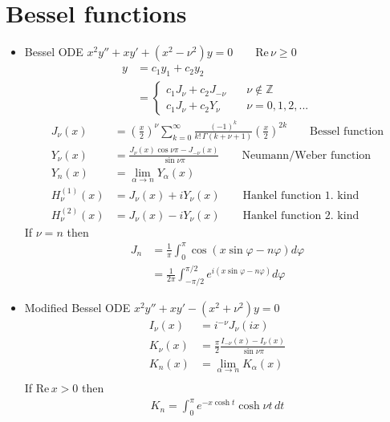\documentclass[../main.tex]{subfiles}
\begin{document}
\section{Bessel functions}
\begin{itemize}
\item Bessel ODE $x^2y''+xy'+(x^2-\nu^2)y=0\qquad \text{Re}\,\nu\ge0$
\begin{align}
y&=c_1y_1+c_2y_2\\
&=\left\{\begin{array}{ll}
c_1J_\nu+c_2J_{-\nu} &  \quad\nu\notin\mathbb{Z}\\
c_1J_\nu+c_2Y_{\nu}  &  \quad\nu=0,1,2,...
\end{array}\right.
\end{align}
\begin{align}
J_\nu(x)&=\left(\frac{x}{2}\right)^\nu\sum_{k=0}^\infty\frac{(-1)^k}{k!\,\Gamma(k+\nu+1)}\left(\frac{x}{2}\right)^{2k}\qquad\text{Bessel function}\\
Y_\nu(x)&=\frac{J_\nu(x)\cos\nu\pi-J_{-\nu}(x)}{\sin\nu\pi}\qquad\text{Neumann/Weber function}\\
Y_n(x)&=\lim_{\alpha\rightarrow n}Y_{\alpha}(x)\\
H_\nu^{(1)}(x)&=J_\nu(x)+iY_\nu(x)\qquad\text{Hankel function 1. kind}\\
H_\nu^{(2)}(x)&=J_\nu(x)-iY_\nu(x)\qquad\text{Hankel function 2. kind}
\end{align}
If $\nu=n$ then 
\begin{align}
J_n
&=\frac{1}{\pi}\int_0^\pi\cos(x\sin\varphi-n\varphi)d\varphi\\
&=\frac{1}{2\pi}\int_{-\pi/2}^{\pi/2}e^{i(x\sin\varphi-n\varphi)}d\varphi
\end{align}

\item Modified Bessel ODE $x^2y''+xy'-(x^2+\nu^2)y=0$
\begin{align}
I_\nu(x)&=i^{-\nu}J_\nu(ix)\\
K_\nu(x)&=\frac{\pi}{2}\frac{I_{-\nu}(x)-I_{\nu}(x)}{\sin\nu\pi}\\
K_n(x)&=\lim_{\alpha\rightarrow n}K_{\alpha}(x)\\
\end{align}
If $\text{Re}\,x>0$ then 
\begin{align}
K_n=\int_0^\pi e^{-x\cosh t}\cosh\nu t\,dt
\end{align}

\end{itemize}
\end{document}
